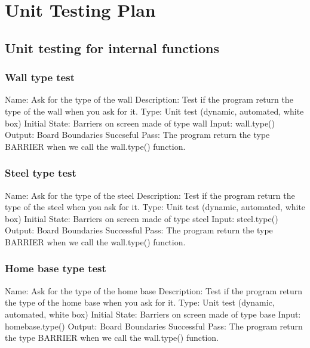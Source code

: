 \documentclass{article}
\begin{document}
\section{Unit Testing Plan}
\subsection{Unit testing for internal functions}
\subsubsection{Wall type test}
Name:  Ask for the type of the wall\newline
Description: Test if the program return the type of the wall when you ask for 
it. \newline
Type: Unit test (dynamic, automated, white box) \newline
Initial State:  Barriers on screen made of type wall \newline
Input: wall.type()\newline
Output: Board Boundaries Succseful  \newline
Pass:   The program return the type BARRIER when we call the wall.type() 
function. \newline

\subsubsection{Steel type test}
Name:  Ask for the type of the steel\newline
Description: Test if the program return the type of the steel when you ask for 
it. \newline
Type: Unit test (dynamic, automated, white box) \newline
Initial State:  Barriers on screen made of type steel \newline
Input: steel.type()\newline
Output: Board Boundaries Successful  \newline
Pass:  The program return the type BARRIER when we call the wall.type() 
function. \newline

\subsubsection{Home base type test}
Name:  Ask for the type of the home base\newline
Description: Test if the program return the type of the home base when you ask
 for it. \newline
Type: Unit test (dynamic, automated, white box) \newline
Initial State:  Barriers on screen made of type base \newline
Input: homebase.type()\newline
Output: Board Boundaries Successful  \newline
Pass:  The program return the type BARRIER when we call the wall.type() 
function. \newline
\end{document}
